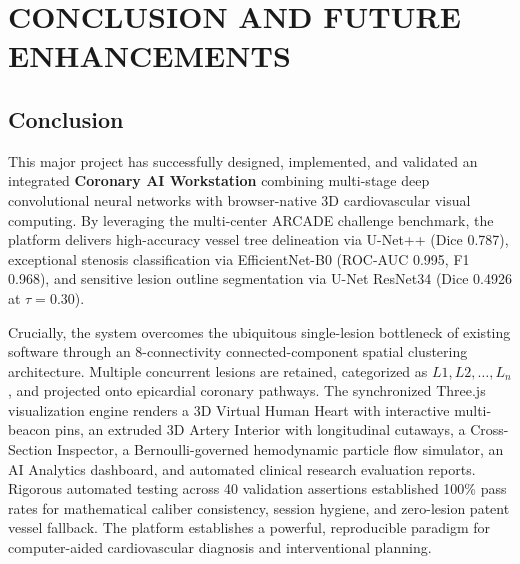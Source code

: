 \chapter{CONCLUSION AND FUTURE ENHANCEMENTS}

\section{Conclusion}
This major project has successfully designed, implemented, and validated an integrated \textbf{Coronary AI Workstation} combining multi-stage deep convolutional neural networks with browser-native 3D cardiovascular visual computing. By leveraging the multi-center ARCADE challenge benchmark, the platform delivers high-accuracy vessel tree delineation via U-Net++ (Dice 0.787), exceptional stenosis classification via EfficientNet-B0 (ROC-AUC 0.995, F1 0.968), and sensitive lesion outline segmentation via U-Net ResNet34 (Dice 0.4926 at $\tau = 0.30$).

Crucially, the system overcomes the ubiquitous single-lesion bottleneck of existing software through an 8-connectivity connected-component spatial clustering architecture. Multiple concurrent lesions are retained, categorized as $L1, L2, \dots, L_n$, and projected onto epicardial coronary pathways. The synchronized Three.js visualization engine renders a 3D Virtual Human Heart with interactive multi-beacon pins, an extruded 3D Artery Interior with longitudinal cutaways, a Cross-Section Inspector, a Bernoulli-governed hemodynamic particle flow simulator, an AI Analytics dashboard, and automated clinical research evaluation reports. Rigorous automated testing across 40 validation assertions established 100\% pass rates for mathematical caliber consistency, session hygiene, and zero-lesion patent vessel fallback. The platform establishes a powerful, reproducible paradigm for computer-aided cardiovascular diagnosis and interventional planning.


